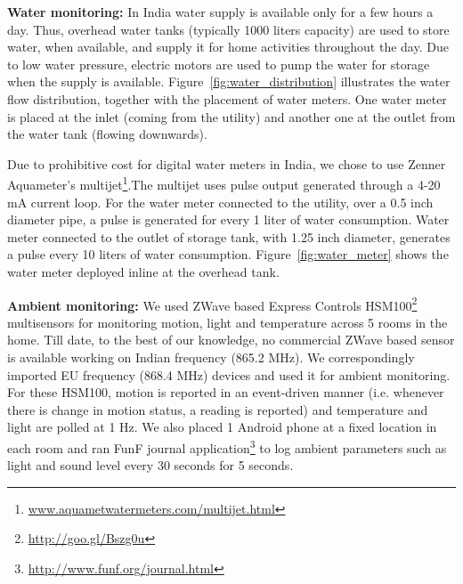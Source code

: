 \documentclass[10pt]{sensys-proc}
\newcommand{\figref}[1]{Figure~\ref{#1}}
\begin{document}
\noindent \textbf{Water monitoring:} 
In India water supply is available only for a few hours a day. Thus, overhead water tanks (typically 1000 liters capacity) are used to store water, when available, and supply it for home activities throughout the day. Due to low water pressure, electric motors are used to pump the water for storage when the supply is available. %
\figref{fig:water_distribution} illustrates the water flow distribution, together with the placement of water meters. One water meter is placed at the inlet (coming from the utility) and another one at the outlet from the water tank (flowing downwards). %

Due to prohibitive cost for digital water meters in India, we chose to use Zenner Aquameter's multijet\footnote{\url{www.aquametwatermeters.com/multijet.html}}.The multijet uses pulse output generated through a 4-20 mA current loop. 
For the water meter connected to the utility, over a 0.5 inch diameter pipe, a pulse is generated for every 1 liter of water consumption. Water meter connected to the outlet of storage tank, with 1.25 inch diameter, generates a pulse every 10 liters of water consumption. %
\figref{fig:water_meter} shows the water meter deployed inline at the overhead tank.

\noindent \textbf{Ambient monitoring:} We used ZWave based Express Controls HSM100\footnote{\url{http://goo.gl/Bszg0u}} multisensors for monitoring motion, light and temperature across 5 rooms in the home. Till date, to the best of our knowledge, no commercial ZWave based sensor is available working on Indian frequency (865.2 MHz). We correspondingly imported EU frequency (868.4 MHz) devices and used it for ambient monitoring. For these HSM100, motion is reported in an event-driven manner (i.e. whenever there is change in motion status, a reading is reported) and temperature and light are polled at 1 Hz. We also placed 1 Android phone at a fixed location in each room and ran FunF journal application\footnote{\url{http://www.funf.org/journal.html}} to log ambient parameters such as light and sound level every 30 seconds for 5 seconds.
\end{document}
